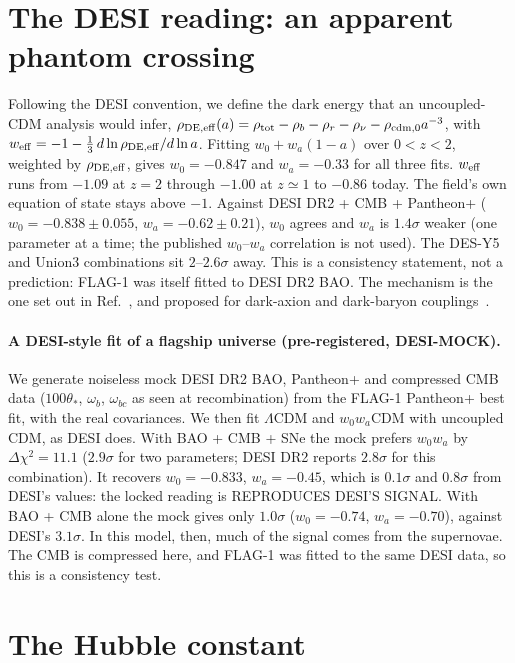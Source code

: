 \documentclass[11pt]{article}
\begin{document}
\section{The DESI reading: an apparent phantom crossing}
Following the DESI convention, we define the dark energy that an uncoupled-CDM analysis would infer,
$\rho_{\rm DE,eff}(a)=\rho_{\rm tot}-\rho_b-\rho_r-\rho_\nu-\rho_{\rm cdm,0}a^{-3}$, with $w_{\rm eff}=-1-\frac13\,
d\ln\rho_{\rm DE,eff}/d\ln a$. Fitting $w_0+w_a(1-a)$ over $0<z<2$, weighted by $\rho_{\rm DE,eff}$, gives
$w_0=-0.847$ and $w_a=-0.33$ for all three fits. $w_{\rm eff}$ runs from $-1.09$ at $z=2$ through $-1.00$ at $z\simeq1$
to $-0.86$ today. The field's own equation of state stays above $-1$. Against DESI DR2 + CMB + Pantheon+ ($w_0=-0.838\pm
0.055$, $w_a=-0.62\pm0.21$), $w_0$ agrees and $w_a$ is $1.4\sigma$ weaker (one parameter at a time; the published
$w_0$--$w_a$ correlation is not used). The DES-Y5 and Union3 combinations sit $2$--$2.6\sigma$ away. This is a
consistency statement, not a prediction: FLAG-1 was itself fitted to DESI DR2 BAO. The mechanism is the one set out
in Ref.~\cite{antusch2026}, and proposed for dark-axion and dark-baryon couplings~\cite{prl2026}.

\paragraph{A DESI-style fit of a flagship universe (pre-registered, DESI-MOCK).} We generate noiseless mock DESI DR2 BAO,
Pantheon+ and compressed CMB data ($100\theta_*$, $\omega_b$, $\omega_{bc}$ as seen at recombination) from the FLAG-1
Pantheon+ best fit, with the real covariances. We then fit $\Lambda$CDM and $w_0w_a$CDM with uncoupled CDM, as DESI does.
With BAO + CMB + SNe the mock prefers $w_0w_a$ by $\Delta\chi^2=11.1$ ($2.9\sigma$ for two parameters; DESI DR2 reports
$2.8\sigma$ for this combination). It recovers $w_0=-0.833$, $w_a=-0.45$, which is $0.1\sigma$ and $0.8\sigma$ from
DESI's values: the locked reading is REPRODUCES DESI'S SIGNAL. With BAO + CMB alone the mock gives only $1.0\sigma$
($w_0=-0.74$, $w_a=-0.70$), against DESI's $3.1\sigma$. In this model, then, much of the signal comes from the
supernovae. The CMB is compressed here, and FLAG-1 was fitted to the same DESI data, so this is a consistency test.

\section{The Hubble constant}
\end{document}
